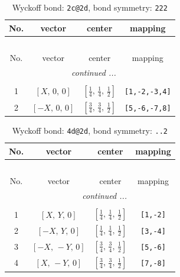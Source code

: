 \documentclass[fleqn,8pt]{jsarticle}
\begin{document}
\begin{longtable}{cccc}
\caption{Wyckoff bond: {\tt 2c@2d}, bond symmetry: {\tt 222}}
 \\
 \hline \hline
No. & vector & center & mapping \\ \hline \endfirsthead

\multicolumn{3}{l}{\tablename\ \thetable{}} \\
 \hline \hline
No. & vector & center & mapping \\ \hline \endhead

 \hline \hline
\multicolumn{3}{r}{\footnotesize\it continued ...} \\ \endfoot

 \hline \hline
\multicolumn{3}{r}{} \\ \endlastfoot

1 & $\left[ X,\, 0,\, 0 \right]$ & $\left[ \frac{1}{4},\, \frac{1}{4},\, \frac{1}{2} \right]$ & {\tt [1,-2,-3,4]} \\ \hline
2 & $\left[ - X,\, 0,\, 0 \right]$ & $\left[ \frac{3}{4},\, \frac{3}{4},\, \frac{1}{2} \right]$ & {\tt [5,-6,-7,8]} \\
\end{longtable}
\renewcommand{\arraystretch}{1.2}
\begin{longtable}{cccc}
\caption{Wyckoff bond: {\tt 4d@2d}, bond symmetry: {\tt ..2}}
 \\
 \hline \hline
No. & vector & center & mapping \\ \hline \endfirsthead

\multicolumn{3}{l}{\tablename\ \thetable{}} \\
 \hline \hline
No. & vector & center & mapping \\ \hline \endhead

 \hline \hline
\multicolumn{3}{r}{\footnotesize\it continued ...} \\ \endfoot

 \hline \hline
\multicolumn{3}{r}{} \\ \endlastfoot

1 & $\left[ X,\, Y,\, 0 \right]$ & $\left[ \frac{1}{4},\, \frac{1}{4},\, \frac{1}{2} \right]$ & {\tt [1,-2]} \\ \hline
2 & $\left[ - X,\, Y,\, 0 \right]$ & $\left[ \frac{1}{4},\, \frac{1}{4},\, \frac{1}{2} \right]$ & {\tt [3,-4]} \\ \hline
3 & $\left[ - X,\, - Y,\, 0 \right]$ & $\left[ \frac{3}{4},\, \frac{3}{4},\, \frac{1}{2} \right]$ & {\tt [5,-6]} \\ \hline
4 & $\left[ X,\, - Y,\, 0 \right]$ & $\left[ \frac{3}{4},\, \frac{3}{4},\, \frac{1}{2} \right]$ & {\tt [7,-8]} \\
\end{longtable}
\end{document}
